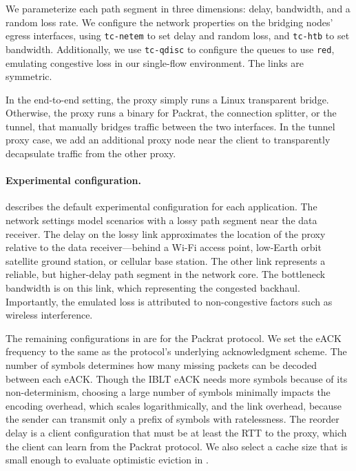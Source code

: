 We parameterize each path segment in three dimensions: delay, bandwidth, and a
random loss rate. We configure the network properties on the bridging nodes’
egress interfaces, using \texttt{tc-netem} to set delay and random loss,
and \texttt{tc-htb} to set bandwidth. Additionally, we use \texttt{tc-qdisc} to
configure the queues to use \texttt{red}, emulating congestive loss in our
single-flow environment. The links are symmetric.

In the end-to-end setting, the proxy simply runs a Linux transparent bridge.
Otherwise, the
proxy runs a binary for Packrat, the connection splitter, or the tunnel, that
manually bridges traffic between the two interfaces.
In the tunnel proxy case, we add an additional proxy
node near the client to transparently decapsulate traffic from the other
proxy.



\paragraph{Experimental configuration.}

 describes the default experimental configuration
for each application. The network settings model scenarios with a lossy path
segment near the data receiver. The delay on the lossy link approximates the
location of the proxy relative to the data receiver---behind a Wi-Fi access
point, low-Earth orbit satellite ground station, or cellular base station.
The other link represents a reliable, but higher-delay path segment in the
network core. The bottleneck bandwidth is on this link, which
representing the congested backhaul. Importantly, the emulated loss is
attributed to non-congestive factors such as wireless interference.

The remaining configurations in  are for the Packrat
protocol. We set the eACK frequency to the same as the protocol's underlying
acknowledgment scheme. The number of symbols determines how many missing
packets can be decoded between each eACK. Though the IBLT eACK needs more symbols
because of its non-determinism, choosing a large number of symbols minimally
impacts the encoding overhead, which scales logarithmically, and the link
overhead, because the sender can transmit only a prefix of symbols
with ratelessness.
The reorder delay is a client configuration that
must be at least the RTT to the proxy, which the client can learn from the Packrat
protocol. We also select a cache size that is small enough to evaluate
optimistic eviction in .


